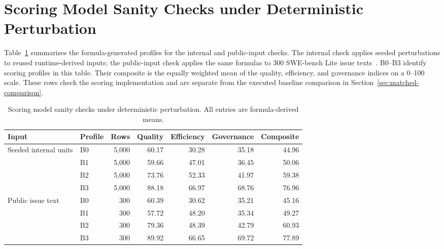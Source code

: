 \documentclass[manuscript,review]{acmart}
\begin{document}

\nocite{R94}



\clearpage
\appendix
\section{Scoring Model Sanity Checks under Deterministic Perturbation}\label{sec:stress-testing}
Table~\ref{tab:scoring-sanity-checks} summarizes the formula-generated profiles for the internal and public-input checks. The internal check applies seeded perturbations to reused runtime-derived inputs; the public-input check applies the same formulas to 300 SWE-bench Lite issue texts~\cite{R26}. B0--B3 identify scoring profiles in this table. Their composite is the equally weighted mean of the quality, efficiency, and governance indices on a 0--100 scale. These rows check the scoring implementation and are separate from the executed baseline comparison in Section~\ref{sec:matched-comparison}.

\begin{table}[H]
\centering
\small
\caption{Scoring model sanity checks under deterministic perturbation. All entries are formula-derived means.}
\label{tab:scoring-sanity-checks}
\begin{tabular}{@{}llrrrrr@{}}
\toprule
Input & Profile & Rows & Quality & Efficiency & Governance & Composite \\
\midrule
Seeded internal units & B0 & 5,000 & 60.17 & 30.28 & 35.18 & 44.96 \\
 & B1 & 5,000 & 59.66 & 47.01 & 36.45 & 50.06 \\
 & B2 & 5,000 & 73.76 & 52.33 & 41.97 & 59.38 \\
 & B3 & 5,000 & 88.18 & 66.97 & 68.76 & 76.96 \\
\midrule
Public issue text & B0 & 300 & 60.39 & 30.62 & 35.21 & 45.16 \\
 & B1 & 300 & 57.72 & 48.20 & 35.34 & 49.27 \\
 & B2 & 300 & 79.36 & 48.39 & 42.79 & 60.93 \\
 & B3 & 300 & 89.92 & 66.65 & 69.72 & 77.89 \\
\bottomrule
\end{tabular}
\end{table}
\end{document}
